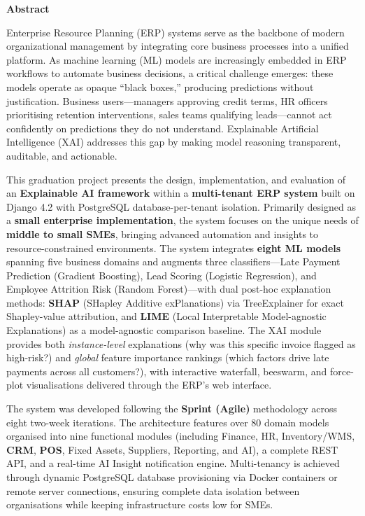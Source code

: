 \documentclass[12pt,a4paper]{report}
\begin{document}
\newpage

\newpage
\thispagestyle{empty}
\vspace*{2cm}
\begin{center}
{\LARGE\textbf{Abstract}}\\[1.5cm]
\end{center}

Enterprise Resource Planning (ERP) systems serve as the backbone of modern organizational management by integrating core business processes into a unified platform. As machine learning (ML) models are increasingly embedded in ERP workflows to automate business decisions, a critical challenge emerges: these models operate as opaque ``black boxes,'' producing predictions without justification. Business users---managers approving credit terms, HR officers prioritising retention interventions, sales teams qualifying leads---cannot act confidently on predictions they do not understand. Explainable Artificial Intelligence (XAI) addresses this gap by making model reasoning transparent, auditable, and actionable.

This graduation project presents the design, implementation, and evaluation of an \textbf{Explainable AI framework} within a \textbf{multi-tenant ERP system} built on Django 4.2 with PostgreSQL database-per-tenant isolation. Primarily designed as a \textbf{small enterprise implementation}, the system focuses on the unique needs of \textbf{middle to small SMEs}, bringing advanced automation and insights to resource-constrained environments. The system integrates \textbf{eight ML models} spanning five business domains and augments three classifiers---Late Payment Prediction (Gradient Boosting), Lead Scoring (Logistic Regression), and Employee Attrition Risk (Random Forest)---with dual post-hoc explanation methods: \textbf{SHAP} (SHapley Additive exPlanations) via TreeExplainer for exact Shapley-value attribution, and \textbf{LIME} (Local Interpretable Model-agnostic Explanations) as a model-agnostic comparison baseline. The XAI module provides both \textit{instance-level} explanations (why was this specific invoice flagged as high-risk?) and \textit{global} feature importance rankings (which factors drive late payments across all customers?), with interactive waterfall, beeswarm, and force-plot visualisations delivered through the ERP's web interface.

The system was developed following the \textbf{Sprint (Agile)} methodology across eight two-week iterations. The architecture features over 80 domain models organised into nine functional modules (including Finance, HR, Inventory/WMS, \textbf{CRM}, \textbf{POS}, Fixed Assets, Suppliers, Reporting, and AI), a complete REST API, and a real-time AI Insight notification engine. Multi-tenancy is achieved through dynamic PostgreSQL database provisioning via Docker containers or remote server connections, ensuring complete data isolation between organisations while keeping infrastructure costs low for SMEs.
\end{document}

